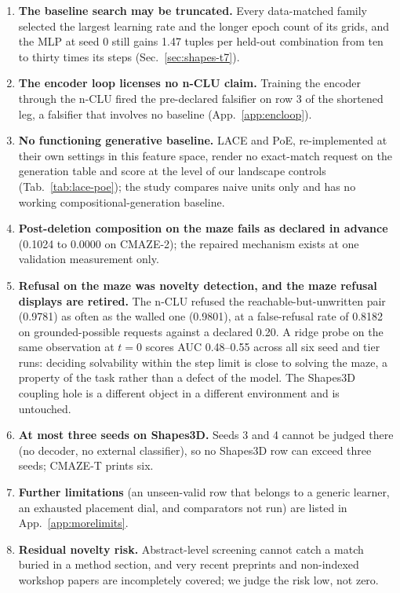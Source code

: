 \documentclass{article} %
\begin{document}
\begin{enumerate}[leftmargin=*,itemsep=1pt]
  64 on any swept partition (the validation sweep labels itself a smoke, not a claim).
\item \textbf{The baseline search may be truncated.} Every data-matched family selected the largest
  learning rate and the longer epoch count of its grids, and the MLP at seed 0 still gains 1.47 tuples %
  per held-out combination from ten to thirty times its steps (Sec.~\ref{sec:shapes-t7}).
\item \textbf{The encoder loop licenses no n-CLU claim.} Training the encoder through the n-CLU
  fired the pre-declared falsifier on row 3 of the shortened leg, a falsifier that involves no baseline %
  (App.~\ref{app:encloop}).
\item \textbf{No functioning generative baseline.} LACE and PoE, re-implemented at their own settings
  in this feature space, render no exact-match request on the generation table and score at the level
  of our landscape controls (Tab.~\ref{tab:lace-poe}); the study compares naive units only and has no
  working compositional-generation baseline.
\item \textbf{Post-deletion composition on the maze fails as declared in advance} (0.1024 to 0.0000
  on CMAZE-2); the repaired mechanism exists at one validation measurement only.
\item \textbf{Refusal on the maze was novelty detection, and the maze refusal displays are
  retired.} The n-CLU refused the reachable-but-unwritten pair (0.9781) as often as the walled
  one (0.9801), at a false-refusal rate of 0.8182 on grounded-possible requests against a
  declared 0.20. %
  A ridge probe on the same observation at $t=0$ scores AUC 0.48--0.55 across all six seed and
  tier runs: deciding solvability within the step limit is close to solving the maze, a property of the
  task rather than a defect of the model. %
  The Shapes3D coupling hole is a different object in a different environment and is untouched.
\item \textbf{At most three seeds on Shapes3D.} Seeds 3 and 4 cannot be judged there (no decoder, no
  external classifier), so no Shapes3D row can exceed three seeds; CMAZE-T prints six.
\item \textbf{Further limitations} (an unseen-valid row that belongs to a generic learner, an
  exhausted placement dial, and comparators not run) are listed in App.~\ref{app:morelimits}.
\item \textbf{Residual novelty risk.} Abstract-level screening cannot catch a match buried in a
  method section, and very recent preprints and non-indexed workshop papers are incompletely
  covered; we judge the risk low, not zero. %
\end{enumerate}
\end{document}
